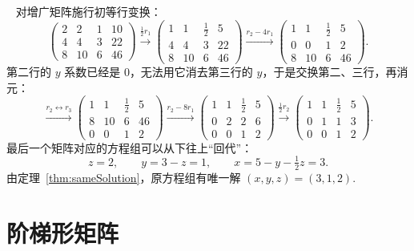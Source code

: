\documentclass[lang=cn,10.5pt,scheme=chinese,toc=twocol,section,chinesefont=nofont,
twoside,citestyle=gb7714-2015,bibstyle=gb7714-2015]{elegantbook}
\newcommand*{\kaishu}{\CJKfamily{zhkai}}
\renewcommand*{\citshape}{\kaishu}
\numberwithin{equation}{section}   %
\newcommand*{\lnlabel}[1]{{\sffamily\bfseries\color{black}#1}}
\renewenvironment{solution}{\par\noindent\lnlabel{\solutionname}\ \citshape}{\par}
\begin{document}
\begin{solution}
  对增广矩阵施行初等行变换：
  \[
    \begin{pmatrix}
      2 & 2  & 1 & 10 \\
      4 & 4  & 3 & 22 \\
      8 & 10 & 6 & 46
    \end{pmatrix}
    \xrightarrow{\frac12 r_1}
    \begin{pmatrix}
      1 & 1  & \frac{1}{2} & 5  \\
      4 & 4  & 3           & 22 \\
      8 & 10 & 6           & 46
    \end{pmatrix}
    \xrightarrow{r_2-4r_1}
    \begin{pmatrix}
      1 & 1  & \frac{1}{2} & 5  \\
      0 & 0  & 1           & 2  \\
      8 & 10 & 6           & 46
    \end{pmatrix}
    .
  \]
  第二行的 $y$ 系数已经是 $0$，无法用它消去第三行的 $y$，于是交换第二、三行，再消元：
  \[
    \xrightarrow{r_2\leftrightarrow r_3}
    \begin{pmatrix}
      1 & 1  & \frac{1}{2} & 5  \\
      8 & 10 & 6           & 46 \\
      0 & 0  & 1           & 2
    \end{pmatrix}
    \xrightarrow{r_2-8r_1}
    \begin{pmatrix}
      1 & 1 & \frac{1}{2} & 5 \\
      0 & 2 & 2           & 6 \\
      0 & 0 & 1           & 2
    \end{pmatrix}
    \xrightarrow{\frac12 r_2}
    \begin{pmatrix}
      1 & 1 & \frac{1}{2} & 5 \\
      0 & 1 & 1           & 3 \\
      0 & 0 & 1           & 2
    \end{pmatrix}
    .
  \]
  最后一个矩阵对应的方程组可以从下往上“回代”：
  \[
    z=2,\qquad y=3-z=1,\qquad x=5-y-\tfrac12z=3.
  \]
  由定理~\ref{thm:sameSolution}，原方程组有唯一解 $(x,y,z)=(3,1,2)$.
\end{solution}

\section{阶梯形矩阵}
\end{document}
